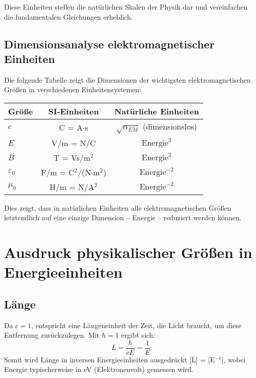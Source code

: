 \documentclass[12pt,a4paper]{article}
\begin{document}
	Diese Einheiten stellen die natürlichen Skalen der Physik dar und vereinfachen die fundamentalen Gleichungen erheblich.
	
	\subsection{Dimensionsanalyse elektromagnetischer Einheiten}
	
	Die folgende Tabelle zeigt die Dimensionen der wichtigsten elektromagnetischen Größen in verschiedenen Einheitensystemen:
	
	\begin{center}
		\begin{tabular}{|l|c|c|}
			\hline
			\textbf{Größe} & \textbf{SI-Einheiten} & \textbf{Natürliche Einheiten}\\
			\hline
			$e$ & C = A$\cdot$s & $\sqrt{\alpha_{EM}}$ (dimensionslos) \\
			$E$ & V/m = N/C & $\text{Energie}^2$ \\
			$B$ & T = Vs/m$^2$ & $\text{Energie}^2$ \\
			$\varepsilon_0$ & F/m = C$^2$/(N$\cdot$m$^2$) & $\text{Energie}^{-2}$ \\
			$\mu_0$ & H/m = N/A$^2$ & $\text{Energie}^{-2}$ \\
			\hline
		\end{tabular}
	\end{center}
	
	Dies zeigt, dass in natürlichen Einheiten alle elektromagnetischen Größen letztendlich auf eine einzige Dimension – Energie – reduziert werden können.
	
	\section{Ausdruck physikalischer Größen in Energieeinheiten}
	
	\subsection{Länge}
	Da $c=1$, entspricht eine Längeneinheit der Zeit, die Licht braucht, um diese Entfernung zurückzulegen. Mit $\hbar=1$ ergibt sich:
	\begin{equation}
		L = \frac{\hbar}{cE} = \frac{1}{E}
	\end{equation}
	Somit wird Länge in inversen Energieeinheiten ausgedrückt [L] = [E$^{-1}$], wobei Energie typischerweise in eV (Elektronenvolt) gemessen wird.
	
\end{document}
